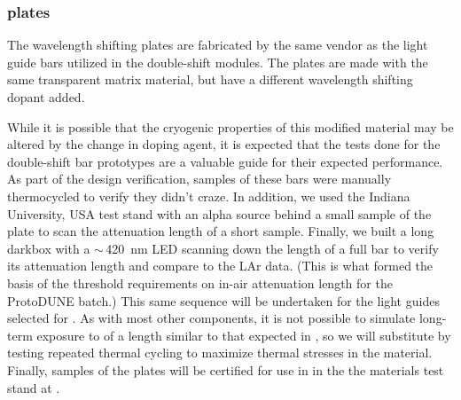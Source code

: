 

\subsubsection{ plates}

The  wavelength shifting plates are fabricated by the same vendor as the light guide bars utilized in the double-shift  modules.  The   plates are made with the same transparent matrix material, but have a different wavelength shifting dopant added.  

While it is possible that the cryogenic properties of this modified  material may be altered by the change in doping agent, it is expected that the tests done for the double-shift bar prototypes are a valuable guide for their expected performance.  As part of the design verification, samples of these bars were manually thermocycled to verify they didn't craze. In addition, we used the Indiana University, USA \lar test stand with an alpha source behind a small sample of the  plate to scan the attenuation length of a short sample. Finally, we built a long darkbox with a $\sim\,$\SI{420}{nm} LED scanning down the length of a full bar to verify its attenuation length and compare to the LAr data. (This is what formed the basis of the threshold requirements on in-air attenuation length for the ProtoDUNE batch.) 
This same sequence will be undertaken for the light guides selected for . As with most other components, it is not possible to simulate long-term exposure to  of a length similar to that expected in , so we will substitute by testing repeated thermal cycling to maximize thermal stresses in the material.  Finally, samples of the  plates will be certified for use in  in the the materials test stand at .  

